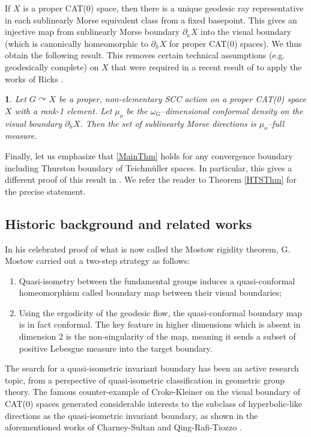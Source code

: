 \documentclass{amsart}
\newtheorem{mainthm}{}
\theoremstyle{definition}
\theoremstyle{remark}
\newcommand{\act}{\curvearrowright}
\newcommand{\U}{ X}
\newcommand{\hU}{\partial_h{  X}}
\newcommand{\e}[1]{\omega_{#1}}
\newcommand{\pka}{\partial_\kappa}
\begin{document}
If $\U$ is a proper CAT(0) space, then there is a unique geodesic ray representative in each sublinearly Morse equivalent class from a fixed basepoint. This gives an injective map from sublinearly Morse boundary $\pka \U$ into the visual boundary (which is canonically homeomorphic to $\hU$ for proper CAT(0) spaces). We thus obtain the following result. This removes certain technical assumptions (e.g. geodesically complete) on $\U$  that were required in a recent result of \cite[Theorem 1.1]{GQR22} to apply the works of Ricks \cite{R17}. 

\begin{mainthm}\label{MainCorollary}
Let $G\act \U$  be a   proper, non-elementary SCC action on a proper CAT(0) space $\U$ with a rank-1 element. Let $\mu_o$ be the $\e G$--dimensional conformal density on the   visual boundary $\hU$. Then  the set of  sublinearly Morse directions is $\mu_o$--full measure. 
\end{mainthm} 

Finally, let us emphasize that \ref{MainThm} holds for any convergence boundary including Thurston boundary of Teichm{\"u}ller spaces. In particular, this gives a different proof of this result in \cite{GQR22}. We refer the reader to Theorem \ref{HTSThm} for  the precise statement. 



\subsection*{Historic background and related works}
In his celebrated proof of what is now called the Mostow rigidity theorem, G. Mostow carried out a two-step strategy as follows: 
\begin{enumerate}
    \item 
    Quasi-isometry between the fundamental groups induces a  quasi-conformal homeomorphism called boundary map between their visual boundaries;
    \item 
    Using the ergodicity of the geodesic flow, the quasi-conformal boundary map is in fact conformal. The key feature in higher dimensions which is absent in dimension 2 is the non‑singularity of the map, meaning it sends a subset of positive Lebesgue measure into the target boundary.
\end{enumerate}
The search for a quasi-isometric invariant boundary has been an active research topic, from a perspective of quasi-isometric classification in geometric group theory. The famous counter-example of Croke-Kleiner \cite{CK00} on the visual boundary of CAT(0) spaces generated  considerable interests  to the subclass of hyperbolic-like directions  as the quasi-isometric invariant boundary, as shown in the aforementioned works of Charney-Sultan \cite{ChaSul} and Qing-Rafi-Tiozzo \cite{QRT2}.
\end{document}
